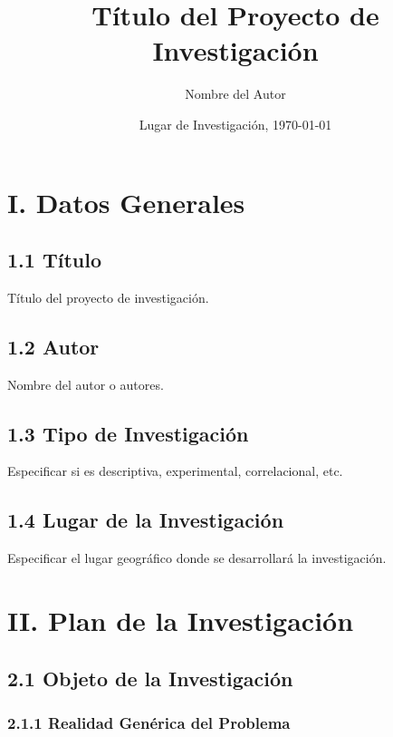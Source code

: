 \documentclass[12pt]{../componentes/uns}
\title{Título del Proyecto de Investigación}
\author{Nombre del Autor}
\date{Lugar de Investigación, \today}
\begin{document}
\maketitle
\newpage

\tableofcontents
\newpage

\section*{I. Datos Generales}

\subsection*{1.1 Título}
Título del proyecto de investigación.

\subsection*{1.2 Autor}
Nombre del autor o autores.

\subsection*{1.3 Tipo de Investigación}
Especificar si es descriptiva, experimental, correlacional, etc.

\subsection*{1.4 Lugar de la Investigación}
Especificar el lugar geográfico donde se desarrollará la investigación.

\section*{II. Plan de la Investigación}

\subsection*{2.1 Objeto de la Investigación}
\subsubsection*{2.1.1 Realidad Genérica del Problema}
\lipsum[1]
\end{document}
